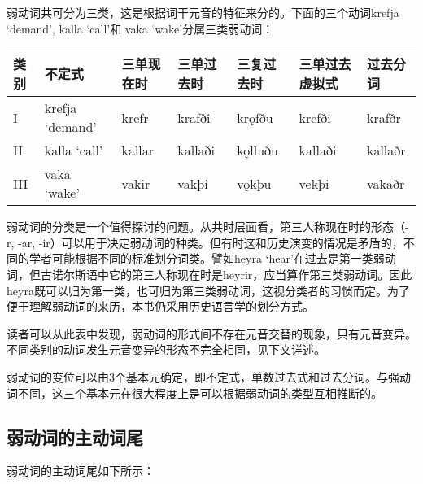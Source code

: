 弱动词共可分为三类，这是根据词干元音的特征来分的。下面的三个动词krefja
`demand‌', kalla `call‌'和 vaka `wake‌'分属三类弱动词：

\begin{longtable}{lllllll}
    \toprule
    类别  & 不定式             & 三单现在时  & 三单过去时   & 三复过去时   & 三单过去虚拟式 & 过去分词    \\
    \midrule
    \endhead
    \bottomrule
    \endfoot
    I   & krefja `demand‌' & krefr  & krafði  & krǫfðu  & krefði  & krafðr  \\
    II  & kalla `call‌'    & kallar & kallaði & kǫlluðu & kallaði & kallaðr \\
    III & vaka `wake‌'     & vakir  & vakþi   & vǫkþu   & vekþi   & vakaðr  \\
\end{longtable}

弱动词的分类是一个值得探讨的问题。从共时层面看，第三人称现在时的形态（-r, -ar, -ir）可以用于决定弱动词的种类。但有时这和历史演变的情况是矛盾的，不同的学者可能根据不同的标准划分词类。譬如heyra `hear‌'在过去是第一类弱动词，但古诺尔斯语中它的第三人称现在时是heyrir，应当算作第三类弱动词。因此heyra既可以归为第一类，也可归为第三类弱动词，这视分类者的习惯而定。为了便于理解弱动词的来历，本书仍采用历史语言学的划分方式。

读者可以从此表中发现，弱动词的形式间不存在元音交替的现象，只有元音变异。不同类别的动词发生元音变异的形态不完全相同，见下文详述。

弱动词的变位可以由3个基本元确定，即不定式，单数过去式和过去分词。与强动词不同，这三个基本元在很大程度上是可以根据弱动词的类型互相推断的。

\subsection{弱动词的主动词尾}\label{弱动词的主动词尾}

弱动词的主动词尾如下所示：

